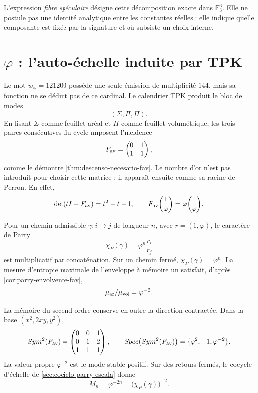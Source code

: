 \def\HMTAxialTheoremDefined{1}

L'expression \emph{fibre spéculaire} désigne cette décomposition exacte dans
\(\mathbb F_3^6\). Elle ne postule pas une identité analytique entre les constantes
réelles : elle indique quelle composante est fixée par la signature et où subsiste un
choix interne.

\section{\texorpdfstring{\(\varphi\)}{Phi} : l'auto-échelle induite par TPK}

Le mot \(w_\varphi=121200\) possède une seule émission de multiplicité
\(144\), mais sa fonction ne se déduit pas de ce cardinal. Le calendrier TPK
produit le bloc de modes
\[
(\Sigma,\Pi,\Pi).
\]
En lisant \(\Sigma\) comme feuillet aréal et \(\Pi\) comme feuillet volumétrique, les
trois paires consécutives du cycle imposent l'incidence
\[
F_{\rm av}
=
\begin{pmatrix}
0&1\\
1&1
\end{pmatrix},
\]
comme le démontre \cref{thm:descenso-necesario-fav}. Le nombre d'or n'est pas
introduit pour choisir cette matrice : il apparaît ensuite comme sa racine de Perron.
En effet,
\[
\det(tI-F_{\rm av})=t^2-t-1,
\qquad
F_{\rm av}\binom{1}{\varphi}
=\varphi\binom{1}{\varphi}.
\]

Pour un chemin admissible \(\gamma:i\to j\) de longueur \(n\), avec
\(r=(1,\varphi)\), le caractère de Parry
\[
\chi_P(\gamma)=\varphi^n\frac{r_i}{r_j}
\]
est multiplicatif par concaténation. Sur un chemin fermé,
\(\chi_P(\gamma)=\varphi^n\). La mesure d'entropie maximale de l'enveloppe
à mémoire un satisfait, d'après \cref{cor:parry-envolvente-fav},
\[
\frac{\mu_{\rm ar}}{\mu_{\rm vol}}=\varphi^{-2}.
\]

La mémoire du second ordre conserve en outre la direction contractée. Dans la
base \((x^2,2xy,y^2)\),
\[
\operatorname{Sym}^2(F_{\rm av})
=
\begin{pmatrix}
0&0&1\\
0&1&2\\
1&1&1
\end{pmatrix},
\qquad
\operatorname{Spec}\bigl(\operatorname{Sym}^2(F_{\rm av})\bigr)
=\{\varphi^2,-1,\varphi^{-2}\}.
\]
La valeur propre \(\varphi^{-2}\) est le mode stable positif. Sur des retours
fermés, le cocycle d'échelle de \cref{sec:cociclo-parry-escala} donne
\[
M_n=\varphi^{-2n}={\bigl(\chi_P(\gamma)\bigr)}^{-2}.
\]


